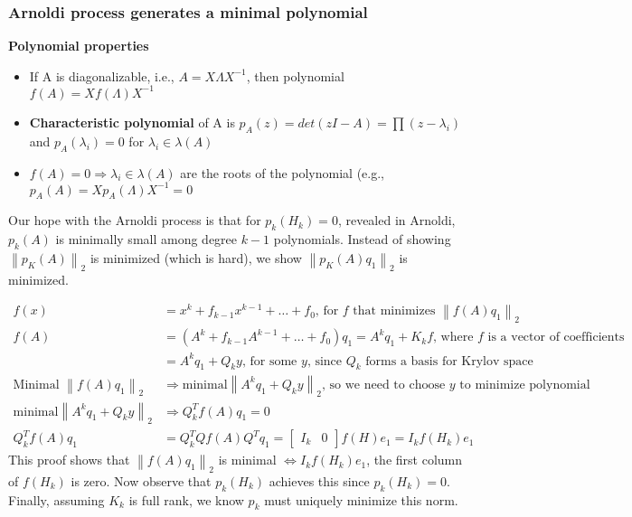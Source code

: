 \documentclass{article}
\newcommand{\norm}[2]{\left\lVert#1\right\rVert_#2}
\begin{document}
\subsubsection{Arnoldi process generates a minimal polynomial}
\textbf{Polynomial properties}
\begin{itemize}
    \item If A is diagonalizable, i.e., $A = X\Lambda X^{-1}$, then polynomial $f(A) = Xf(\Lambda)X^{-1}$
    \item \textbf{Characteristic polynomial} of A is $p_A(z) = det(zI - A) = \prod(z - \lambda_i)$ and $p_A(\lambda_i) = 0$ for $\lambda_i \in \lambda(A)$
    \item $f(A) = 0 \Longrightarrow \lambda_i \in \lambda(A)$ are the roots of the polynomial (e.g., $p_A(A) = Xp_A(\Lambda)X^{-1} = 0$
\end{itemize}
Our hope with the Arnoldi process is that for $p_k(H_k) = 0$, revealed in Arnoldi, $p_k(A)$ is minimally small among degree $k-1$ polynomials. Instead of showing $\norm{p_K(A)}{2}$ is minimized (which is hard), we show $\norm{p_K(A)q_1}{2}$ is minimized.

\begin{align*}
    f(x) &= x^k + f_{k-1}x^{k-1} + \dots + f_0 \textrm{, for $f$ that minimizes } \norm{f(A)q_1}{2}\\
    f(A) &= (A^k + f_{k-1}A^{k-1} + \dots + f_0)q_1 = A^kq_1 + K_kf \textrm{, where $f$ is a vector of coefficients}\\
    &= A^kq_1 + Q_ky \textrm{, for some $y$, since $Q_k$ forms a basis for Krylov space}\\
    \textrm{Minimal }\norm{f(A)q_1}{2} &\Longrightarrow \textrm{minimal} \norm{A^kq_1 + Q_ky}{2} \textrm{, so we need to choose $y$ to minimize polynomial}\\
    \textrm{minimal} \norm{A^kq_1 + Q_ky}{2} & \Longrightarrow Q_k^Tf(A)q_1 = 0\\
    Q_k^Tf(A)q_1 &= Q_k^TQf(A)Q^Tq_1 = \begin{bmatrix} I_k & 0 \end{bmatrix} f(H)e_1 = I_kf(H_k)e_1
\end{align*}
This proof shows that $\norm{f(A)q_1}{2}$ is minimal $\Leftrightarrow I_kf(H_k)e_1$, the first column of $f(H_k)$ is zero. Now observe that $p_k(H_k)$ achieves this since $p_k(H_k) = 0$. Finally, assuming $K_k$ is full rank, we know $p_k$ must uniquely minimize this norm. 

\end{document}
